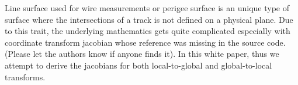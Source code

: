 
Line surface used for wire measurements or perigee surface is an unique type of surface where the intersections of a track is not defined on a physical plane. Due to this trait, the underlying mathematics gets quite complicated especially with coordinate transform jacobian whose reference was missing in the source code. (Please let the authors know if anyone finds it). In this white paper, thus we attempt to derive the jacobians for both local-to-global and global-to-local transforms.
